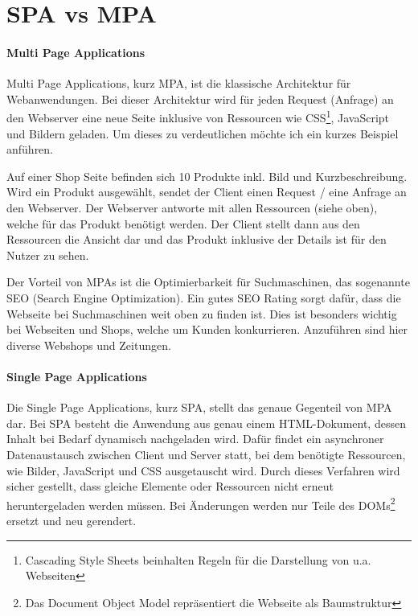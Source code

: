 \section{SPA vs MPA} \label{sec:SPA_vs_MPA}

\paragraph{Multi  Page Applications} \label{para:Multi_Page_Applications}
Multi Page Applications, kurz MPA, ist die klassische Architektur für Webanwendungen. Bei dieser Architektur wird für jeden Request (Anfrage) an den Webserver eine neue Seite inklusive von Ressourcen wie CSS\footnote{Cascading Style Sheets beinhalten Regeln für die Darstellung von u.a. Webseiten}, JavaScript und Bildern geladen. Um dieses zu verdeutlichen möchte ich ein kurzes Beispiel anführen. 

Auf einer Shop Seite befinden sich 10 Produkte inkl. Bild und Kurzbeschreibung. Wird ein Produkt ausgewählt, sendet der Client einen Request / eine Anfrage an den Webserver. Der Webserver antworte mit allen Ressourcen (siehe oben), welche für das Produkt benötigt werden. Der Client stellt dann aus den Ressourcen die Ansicht dar und das Produkt inklusive der Details ist für den Nutzer zu sehen.

Der Vorteil von MPAs ist die Optimierbarkeit für Suchmaschinen, das sogenannte SEO (Search Engine Optimization). Ein gutes SEO Rating sorgt dafür, dass die Webseite bei Suchmaschinen weit oben zu finden ist. Dies ist besonders wichtig bei Webseiten und Shops, welche um Kunden konkurrieren. Anzuführen sind hier diverse Webshops und Zeitungen.

\paragraph{Single Page Applications} \label{para:Single_Page_Applications}
Die Single Page Applications, kurz SPA, stellt das genaue Gegenteil von MPA dar. Bei SPA besteht die Anwendung aus genau einem HTML-Dokument, dessen Inhalt bei Bedarf dynamisch nachgeladen wird. Dafür findet ein asynchroner Datenaustausch zwischen Client und Server statt, bei dem benötigte Ressourcen, wie Bilder, JavaScript und CSS ausgetauscht wird. Durch dieses Verfahren wird sicher gestellt, dass gleiche Elemente oder Ressourcen nicht erneut heruntergeladen werden müssen. Bei Änderungen werden nur Teile des DOMs\footnote{Das Document Object Model repräsentiert die Webseite als Baumstruktur} ersetzt und neu gerendert.

